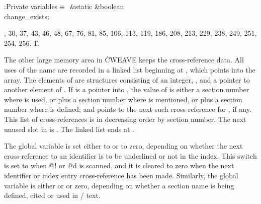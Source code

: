 \Y\B\4:Private variables\X${}\equiv{}$\6
\&{static} \&{boolean} \\{change\_exists};\par
{}, 30, 37, 43, 46, 48, 67, 76, 81, 85, 106, 113, 119, 186, 208, 213, 229,
238, 249, 251, 254, 256.
\U1.\fi

The other large memory area in \.{CWEAVE} keeps the cross-reference data.
All uses of the name  are recorded in a linked list beginning at
, which points into the  array. The elements
of 
are structures consisting of an integer, , and a pointer 
to another element of .  If  is a
pointer into ,
the value of  is either a section number where  is
used,
or  plus a section number where  is mentioned,
or  plus a section number where  is defined;
and  points to the next such cross-reference for ,
if any. This list of cross-references is in decreasing order by
section number. The next unused slot in  is .
The linked list ends at .

The global variable  is set either to 
or to zero,
depending on whether the next cross-reference to an identifier is to be
underlined or not in the index. This switch is set to  when
\.{@!} or \.{@d} is scanned, and it is cleared to zero when
the next identifier or index entry cross-reference has been made.
Similarly, the global variable  is either
 or  or zero, depending
on whether a section name is being defined, cited or used in \CEE/ text.


